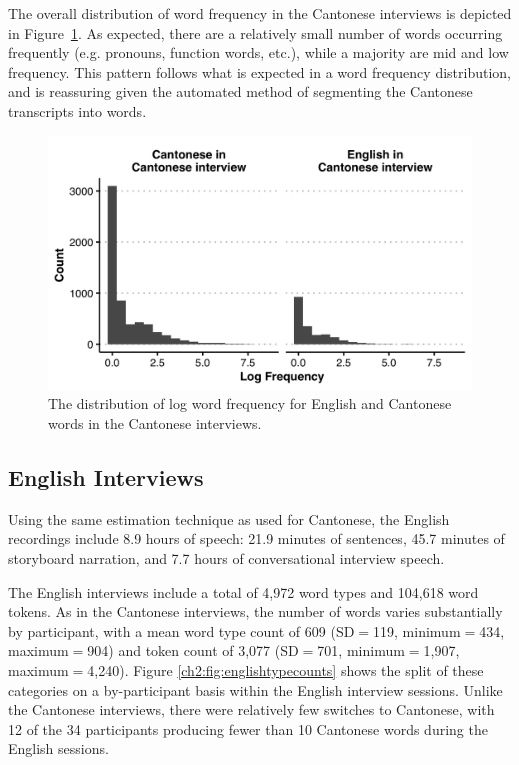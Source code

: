 The overall distribution of word frequency in the Cantonese interviews is depicted in Figure~\ref{ch2:fig:cantonesewordfrequency}. As expected, there are a relatively small number of words occurring frequently (e.g. pronouns, function words, etc.), while a majority are mid and low frequency. This pattern follows what is expected in a word frequency distribution, and is reassuring given the automated method of segmenting the Cantonese transcripts into words. 

\begin{figure}[ht]
  \begin{center}
  \includegraphics[width=4.9in]{figures/ch2_cantonesewordfrequency_5in.png} 
  \caption{The distribution of log word frequency for English and Cantonese words in the Cantonese interviews.}
  \label{ch2:fig:cantonesewordfrequency}
  \end{center}
  \end{figure}

\subsection{English Interviews}\label{ch2:subsec:english_descriptive}

Using the same estimation technique as used for Cantonese, the English recordings include 8.9 hours of speech: 21.9 minutes of sentences, 45.7 minutes of storyboard narration, and 7.7 hours of conversational interview speech.

The English interviews include a total of 4,972 word types and 104,618 word tokens. As in the Cantonese interviews, the number of words varies substantially by participant, with a mean word type count of 609 (SD$=$119, minimum$=$434, maximum$=$904) and token count of 3,077 (SD$=$701, minimum$=$1,907, maximum$=$4,240). Figure \ref{ch2:fig:englishtypecounts} shows the split of these categories on a by-participant basis within the English interview sessions. Unlike the Cantonese interviews, there were relatively few switches to Cantonese, with 12 of the 34 participants producing fewer than 10 Cantonese words during the English sessions.

